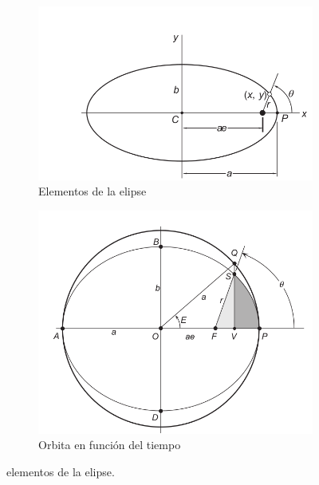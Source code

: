 \begin{figure}[!htpb]
	\begin{subfigure}[b]{0.49\linewidth}
		\includegraphics[width=\linewidth]{./Figures/ellipse_points.png}	
		\caption{Elementos de la elipse}
		\label{fig:elipse_pas}
	\end{subfigure}
	\hfill
	\begin{subfigure}[b]{0.49\linewidth}
		\includegraphics[width=\linewidth]{./Figures/ellipse_withE_time.png}
		\caption{Orbita en función del tiempo}
		\label{fig:ellipse_time}
	\end{subfigure}
	\caption{elementos de la elipse.}
	\label{fig:ellipse}
\end{figure}


